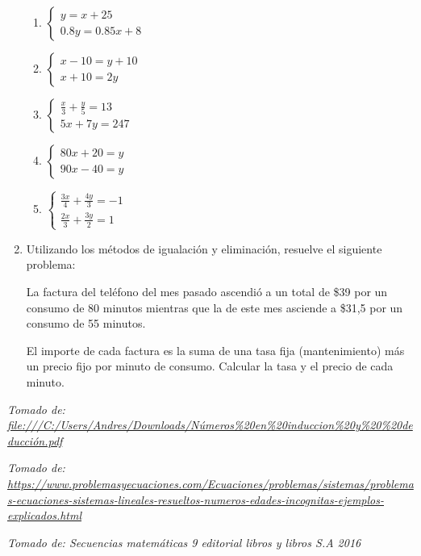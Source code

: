 \documentclass[12pt,a4paper]{article}
\begin{document}
\begin{enumerate}
\begin{enumerate}[label=\alph*.]
        \item $\begin{cases} y = x + 25 \\ 0.8y = 0.85x + 8 \end{cases}$

        \item $\begin{cases} x - 10 = y + 10 \\ x + 10 = 2y \end{cases}$

        \item $\begin{cases} \frac{x}{3} + \frac{y}{5} = 13 \\ 5x + 7y = 247 \end{cases}$

        \item $\begin{cases} 80x + 20 = y \\ 90x - 40 = y \end{cases}$

        \item $\begin{cases} \frac{3x}{4} + \frac{4y}{3} = -1 \\ \frac{2x}{3} + \frac{3y}{2} = 1 \end{cases}$
    \end{enumerate}

    \item Utilizando los métodos de igualación y eliminación, resuelve el siguiente problema:

    La factura del teléfono del mes pasado ascendió a un total de \$39 por un consumo de 80 minutos mientras que la de este mes asciende a \$31,5 por un consumo de 55 minutos.

    El importe de cada factura es la suma de una tasa fija (mantenimiento) más un precio fijo por minuto de consumo. Calcular la tasa y el precio de cada minuto.
\end{enumerate}

\textit{Tomado de: \url{file:///C:/Users/Andres/Downloads/Números\%20en\%20induccion\%20y\%20\%20deducción.pdf}}

\textit{Tomado de: \url{https://www.problemasyecuaciones.com/Ecuaciones/problemas/sistemas/problemas-ecuaciones-sistemas-lineales-resueltos-numeros-edades-incognitas-ejemplos-explicados.html}}

\textit{Tomado de: Secuencias matemáticas 9 editorial libros y libros S.A 2016}
\end{document}

